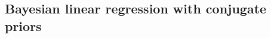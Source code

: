 \documentclass{article}
\theoremstyle{definition}
\theoremstyle{remark}
\begin{document}


\subsection{Bayesian linear regression with conjugate priors}
\end{document}
